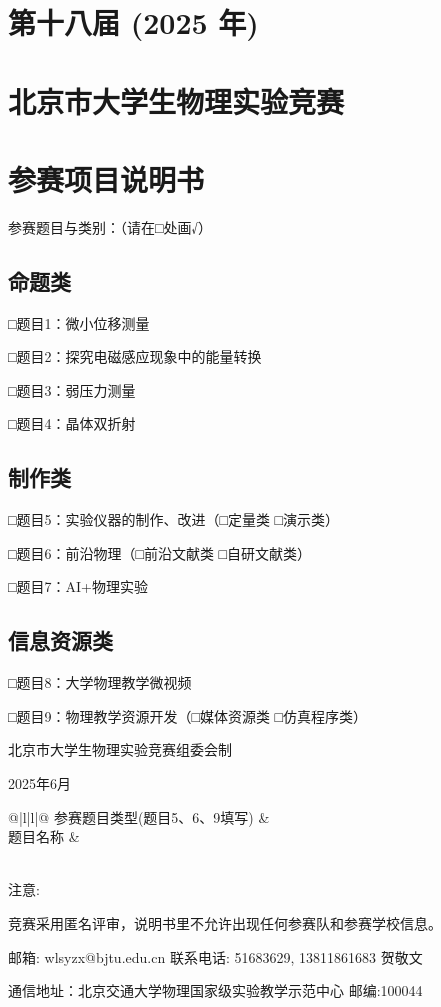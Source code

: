 \documentclass[
  10
]{article}
\author{}
\date{}
\newcounter{none} %
\begin{document}
\section{第十八届 (2025 年)}\label{ux7b2cux5341ux516bux5c4a-2025-ux5e74}

\section{北京市大学生物理实验竞赛}\label{ux5317ux4eacux5e02ux5927ux5b66ux751fux7269ux7406ux5b9eux9a8cux7adeux8d5b}

\section{参赛项目说明书}\label{ux53c2ux8d5bux9879ux76eeux8bf4ux660eux4e66}

参赛题目与类别：（请在□处画√）

\subsection{命题类}\label{ux547dux9898ux7c7b}

□题目1：微小位移测量

□题目2：探究电磁感应现象中的能量转换

□题目3：弱压力测量

□题目4：晶体双折射

\subsection{制作类}\label{ux5236ux4f5cux7c7b}

□题目5：实验仪器的制作、改进（□定量类 □演示类）

□题目6：前沿物理（□前沿文献类 □自研文献类）

□题目7：AI+物理实验

\subsection{信息资源类}\label{ux4fe1ux606fux8d44ux6e90ux7c7b}

□题目8：大学物理教学微视频

□题目9：物理教学资源开发（□媒体资源类 □仿真程序类）

北京市大学生物理实验竞赛组委会制

2025年6月

{\def\LTcaptype{none} %
\begin{longtable}[]{@{}|l|l|@{}}
\toprule\noalign{}
\endhead
\bottomrule\noalign{}
\endlastfoot
\hline
参赛题目类型(题目5、6、9填写) & \\
\hline
题目名称 & \\
\hline
{} \\
\hline
\end{longtable}
}

注意:

竞赛采用匿名评审，说明书里不允许出现任何参赛队和参赛学校信息。

邮箱: wlsyzx@bjtu.edu.cn 联系电话: 51683629, 13811861683 贺敬文

通信地址：北京交通大学物理国家级实验教学示范中心 邮编:100044
\end{document}
